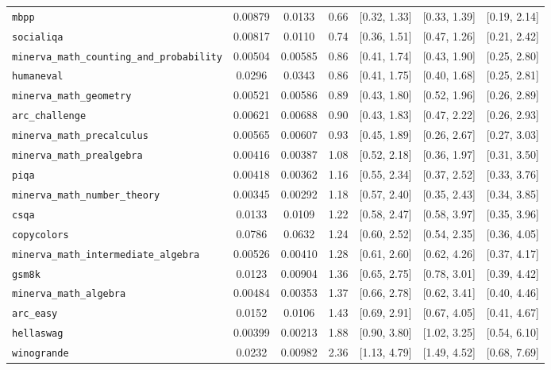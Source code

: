 \begin{table}[!htbp]
\begin{tabular}{@{}lcccccc@{}}
\midrule
\texttt{mbpp} & 0.00879 & 0.0133 & 0.66 & [0.32, 1.33] & [0.33, 1.39] & [0.19, 2.14] \\
\texttt{socialiqa} & 0.00817 & 0.0110 & 0.74 & [0.36, 1.51] & [0.47, 1.26] & [0.21, 2.42] \\
\texttt{minerva\_math\_counting\_and\_probability} & 0.00504 & 0.00585 & 0.86 & [0.41, 1.74] & [0.43, 1.90] & [0.25, 2.80] \\
\texttt{humaneval} & 0.0296 & 0.0343 & 0.86 & [0.41, 1.75] & [0.40, 1.68] & [0.25, 2.81] \\
\texttt{minerva\_math\_geometry} & 0.00521 & 0.00586 & 0.89 & [0.43, 1.80] & [0.52, 1.96] & [0.26, 2.89] \\
\texttt{arc\_challenge} & 0.00621 & 0.00688 & 0.90 & [0.43, 1.83] & [0.47, 2.22] & [0.26, 2.93] \\
\texttt{minerva\_math\_precalculus} & 0.00565 & 0.00607 & 0.93 & [0.45, 1.89] & [0.26, 2.67] & [0.27, 3.03] \\
\texttt{minerva\_math\_prealgebra} & 0.00416 & 0.00387 & 1.08 & [0.52, 2.18] & [0.36, 1.97] & [0.31, 3.50] \\
\texttt{piqa} & 0.00418 & 0.00362 & 1.16 & [0.55, 2.34] & [0.37, 2.52] & [0.33, 3.76] \\
\texttt{minerva\_math\_number\_theory} & 0.00345 & 0.00292 & 1.18 & [0.57, 2.40] & [0.35, 2.43] & [0.34, 3.85] \\
\texttt{csqa} & 0.0133 & 0.0109 & 1.22 & [0.58, 2.47] & [0.58, 3.97] & [0.35, 3.96] \\
\texttt{copycolors} & 0.0786 & 0.0632 & 1.24 & [0.60, 2.52] & [0.54, 2.35] & [0.36, 4.05] \\
\texttt{minerva\_math\_intermediate\_algebra} & 0.00526 & 0.00410 & 1.28 & [0.61, 2.60] & [0.62, 4.26] & [0.37, 4.17] \\
\texttt{gsm8k} & 0.0123 & 0.00904 & 1.36 & [0.65, 2.75] & [0.78, 3.01] & [0.39, 4.42] \\
\texttt{minerva\_math\_algebra} & 0.00484 & 0.00353 & 1.37 & [0.66, 2.78] & [0.62, 3.41] & [0.40, 4.46] \\
\texttt{arc\_easy} & 0.0152 & 0.0106 & 1.43 & [0.69, 2.91] & [0.67, 4.05] & [0.41, 4.67] \\
\texttt{hellaswag} & 0.00399 & 0.00213 & 1.88 & [0.90, 3.80] & [1.02, 3.25] & [0.54, 6.10] \\
\texttt{winogrande} & 0.0232 & 0.00982 & 2.36 & [1.13, 4.79] & [1.49, 4.52] & [0.68, 7.69] \\
\bottomrule
\end{tabular}
\end{table}

